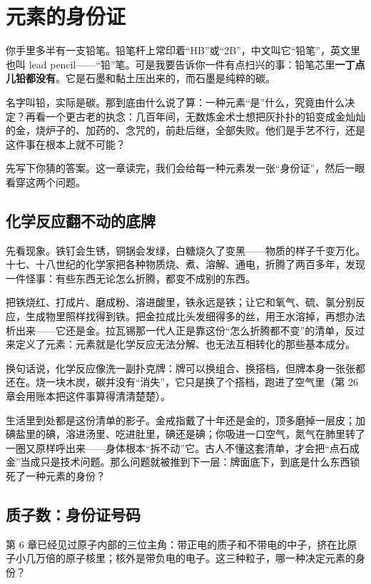 \chapter{元素的身份证}

\begin{kaichang}
你手里多半有一支铅笔。铅笔杆上常印着“HB”或“2B”，中文叫它“铅笔”，英文里也叫 lead pencil——“铅”笔。可是我要告诉你一件有点扫兴的事：铅笔芯里\textbf{一丁点儿铅都没有}。它是石墨和黏土压出来的，而石墨是纯粹的碳。

名字叫铅，实际是碳。那到底由什么说了算：一种元素“是”什么，究竟由什么决定？再看一个更古老的执念：几百年间，无数炼金术士想把灰扑扑的铅变成金灿灿的金，烧炉子的、加药的、念咒的，前赴后继，全部失败。他们是手艺不行，还是这件事在根本上就不可能？

先写下你猜的答案。这一章读完，我们会给每一种元素发一张“身份证”，然后一眼看穿这两个问题。
\end{kaichang}

\section{化学反应翻不动的底牌}

先看现象。铁钉会生锈，铜锅会发绿，白糖烧久了变黑——物质的样子千变万化。十七、十八世纪的化学家把各种物质烧、煮、溶解、通电，折腾了两百多年，发现一件怪事：有些东西无论怎么折腾，都变不成别的东西。

把铁烧红、打成片、磨成粉、溶进酸里，铁永远是铁；让它和氧气、硫、氯分别反应，生成物里照样找得到铁。把金拉成比头发细得多的丝，用王水溶掉，再想办法析出来——它还是金。拉瓦锡那一代人正是靠这份“怎么折腾都不变”的清单，反过来定义了元素：元素就是化学反应无法分解、也无法互相转化的那些基本成分。

换句话说，化学反应像洗一副扑克牌：牌可以换组合、换搭档，但牌本身一张张都还在。烧一块木炭，碳并没有“消失”，它只是换了个搭档，跑进了空气里（第 26 章会用账本把这件事算得清清楚楚）。

生活里到处都是这份清单的影子。金戒指戴了十年还是金的，顶多磨掉一层皮；加碘盐里的碘，溶进汤里、吃进肚里，碘还是碘；你吸进一口空气，氮气在肺里转了一圈又原样呼出来——身体根本“拆不动”它。古人不懂这套清单，才会把“点石成金”当成只是技术问题。那么问题就被推到下一层：牌面底下，到底是什么东西锁死了一种元素的身份？

\section{质子数：身份证号码}

第 6 章已经见过原子内部的三位主角：带正电的质子和不带电的中子，挤在比原子小几万倍的原子核里；核外是带负电的电子。这三种粒子，哪一种决定元素的身份？

